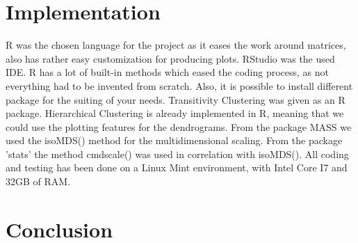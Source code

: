\documentclass[a4paper,10pt]{article}
\theoremstyle{plain}
\theoremstyle{definition}
\begin{document}
\newpage
\section{Implementation}
R was the chosen language for the project as it eases the work around matrices, also has rather easy customization for producing plots. RStudio was the used IDE. R has a lot of built-in methods which eased the coding process, as not everything had to be invented from scratch. Also, it is possible to install different package for the suiting of your needs. Transitivity Clustering was given as an R package. Hierarchical Clustering is already implemented in R, meaning that we could use the plotting features for the dendrograms. From the package MASS we used the isoMDS() method for the multidimensional scaling. From the package 'stats' the method cmdscale() was used in correlation with isoMDS(). All coding and testing has been done on a Linux Mint environment, with Intel Core I7 and 32GB of RAM.

\newpage
\section{Conclusion}





\end{document}
